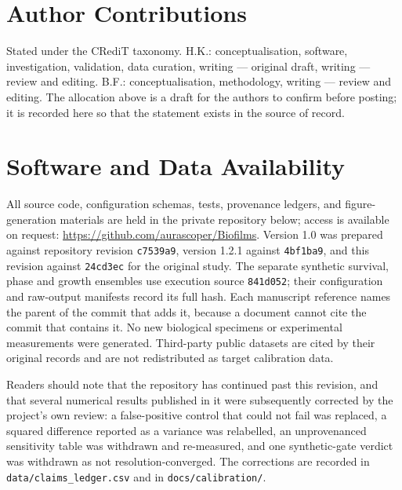 \documentclass[11pt]{article}
\begin{document}
\section*{Author Contributions}
Stated under the CRediT taxonomy. H.K.: conceptualisation, software, investigation, validation,
data curation, writing --- original draft, writing --- review and editing. B.F.: conceptualisation,
methodology, writing --- review and editing. The
allocation above is a draft for the authors to confirm before posting; it is recorded here so that
the statement exists in the source of record.

\section*{Software and Data Availability}
All source code, configuration schemas, tests, provenance ledgers, and figure-generation materials
are held in the private repository below; access is available on request:
\url{https://github.com/aurascoper/Biofilms}. Version 1.0 was prepared against repository
revision \texttt{c7539a9}, version 1.2.1 against \texttt{4bf1ba9}, and this revision against
\texttt{24cd3ec} for the original study. The separate synthetic survival, phase and growth
ensembles use execution source \texttt{841d052}; their configuration and raw-output manifests
record its full hash. Each manuscript reference names the
parent of the commit that adds it, because a document cannot cite the commit that contains it. No new biological specimens or experimental measurements were generated.
Third-party public datasets are cited by their original records and are not redistributed as target
calibration data.

Readers should note that the repository has continued past this revision, and that several
numerical results published in it were subsequently corrected by the project's own review: a
false-positive control that could not fail was replaced, a squared difference reported as a
variance was relabelled, an unprovenanced sensitivity table was withdrawn and re-measured, and
one synthetic-gate verdict was withdrawn as not resolution-converged. The corrections are
recorded in \texttt{data/claims\_ledger.csv} and in \texttt{docs/calibration/}.
\end{document}
